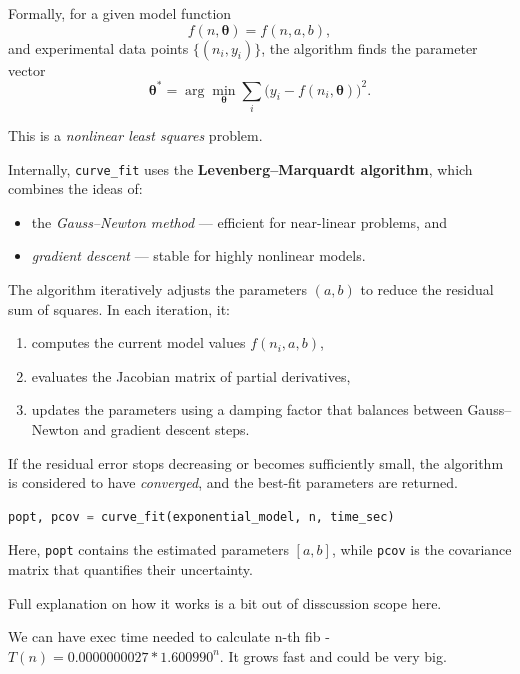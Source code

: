 \documentclass{article}
\begin{document}
Formally, for a given model function
\[
	f(n, \boldsymbol{\theta}) = f(n, a, b),
\]
and experimental data points $\{(n_i, y_i)\}$, the algorithm finds the parameter vector
\[
	\boldsymbol{\theta}^* = \arg\min_{\boldsymbol{\theta}} \sum_i \big( y_i - f(n_i, \boldsymbol{\theta}) \big)^2.
\]

This is a \emph{nonlinear least squares} problem.

\medskip
\noindent
Internally, \texttt{curve\_fit} uses the \textbf{Levenberg–Marquardt algorithm}, which combines the ideas of:
\begin{itemize}
	\item the \emph{Gauss–Newton method} — efficient for near-linear problems, and
	\item \emph{gradient descent} — stable for highly nonlinear models.
\end{itemize}

The algorithm iteratively adjusts the parameters $(a, b)$ to reduce the residual sum of squares. In each iteration, it:
\begin{enumerate}
	\item computes the current model values $f(n_i, a, b)$,
	\item evaluates the Jacobian matrix of partial derivatives,
	\item updates the parameters using a damping factor that balances between Gauss–Newton and gradient descent steps.
\end{enumerate}

\medskip
\noindent
If the residual error stops decreasing or becomes sufficiently small, the algorithm is considered to have \emph{converged}, and the best-fit parameters are returned.

\begin{lstlisting}[language=Python]
popt, pcov = curve_fit(exponential_model, n, time_sec)
\end{lstlisting}

Here, \texttt{popt} contains the estimated parameters $[a, b]$, while \texttt{pcov} is the covariance matrix that quantifies their uncertainty.

Full explanation on how it works is a bit out of disscussion scope here.

We can have exec time needed to calculate n-th fib - $T(n) = 0.0000000027 * 1.600990^n$. It grows fast and could be very big.
\end{document}
